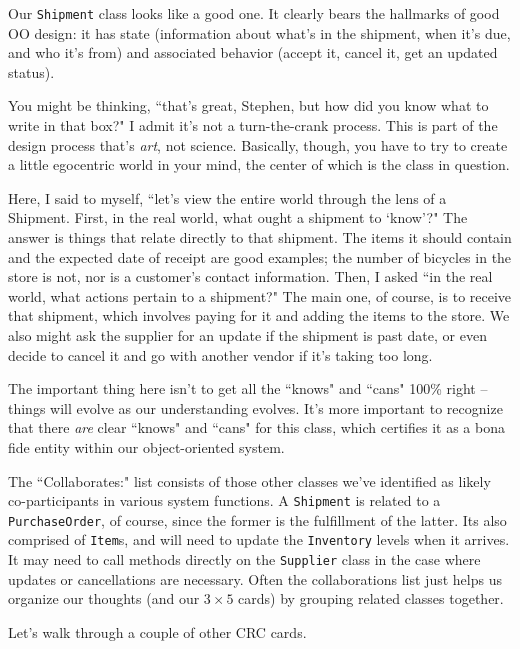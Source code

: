 Our \texttt{Shipment} class looks like a good one. It clearly bears the
hallmarks of good OO design: it has state (information about what's in the
shipment, when it's due, and who it's from) and associated behavior (accept
it, cancel it, get an updated status).

You might be thinking, ``that's great, Stephen, but how did you know what to
write in that box?" I admit it's not a turn-the-crank process. This is part of
the design process that's \textit{art}, not science. Basically, though, you
have to try to create a little egocentric world in your mind, the center of
which is the class in question. 

Here, I said to myself, ``let's view the entire world through the lens of a
Shipment. First, in the real world, what ought a shipment to `know'?" The
answer is things that relate directly to that shipment. The items it should
contain and the expected date of receipt are good examples; the number of
bicycles in the store is not, nor is a customer's contact information. Then, I
asked ``in the real world, what actions pertain to a shipment?" The main one,
of course, is to receive that shipment, which involves paying for it and
adding the items to the store. We also might ask the supplier for an update if
the shipment is past date, or even decide to cancel it and go with another
vendor if it's taking too long.

The important thing here isn't to get all the ``knows" and ``cans" 100\%
right -- things will evolve as our understanding evolves. It's more important
to recognize that there \textit{are} clear ``knows" and ``cans" for this
class, which certifies it as a bona fide entity within our object-oriented
system.

The ``Collaborates:" list consists of those other classes we've identified as
likely co-participants in various system functions. A \texttt{Shipment} is
related to a \texttt{PurchaseOrder}, of course, since the former is the
fulfillment of the latter. Its also comprised of \texttt{Item}s, and will need
to update the \texttt{Inventory} levels when it arrives. It may need to call
methods directly on the \texttt{Supplier} class in the case where updates or
cancellations are necessary. Often the collaborations list just helps us
organize our thoughts (and our $3\times5$ cards) by grouping related classes
together.

Let's walk through a couple of other CRC cards.

